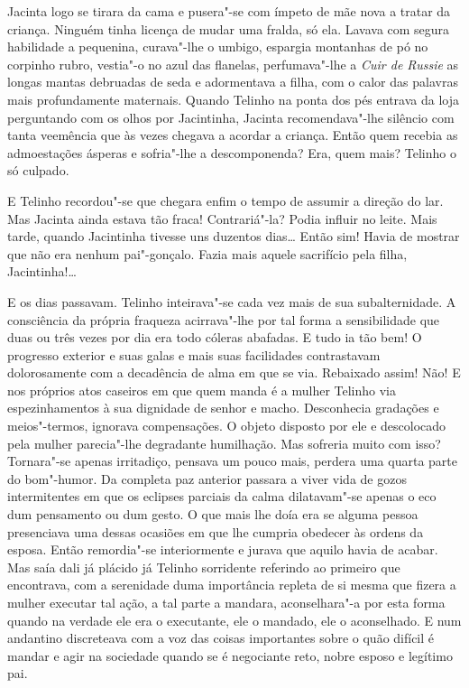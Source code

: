 Jacinta logo se tirara da cama e pusera"-se com ímpeto de mãe nova a
tratar da criança. Ninguém tinha licença de mudar uma fralda, só ela.
Lavava com segura habilidade a pequenina, curava"-lhe o umbigo, espargia
montanhas de pó no corpinho rubro, vestia"-o no azul das flanelas,
perfumava"-lhe a \emph{Cuir de Russie} as longas mantas debruadas de seda
e adormentava a filha, com o calor das palavras mais profundamente
maternais. Quando Telinho na ponta dos pés entrava da loja perguntando
com os olhos por Jacintinha, Jacinta recomendava"-lhe silêncio com tanta
veemência que às vezes chegava a acordar a criança. Então quem recebia
as admoestações ásperas e sofria"-lhe a descomponenda? Era, quem mais?
Telinho o só culpado.

E Telinho recordou"-se que chegara enfim o tempo de assumir a direção do
lar. Mas Jacinta ainda estava tão fraca! Contrariá"-la? Podia influir no
leite. Mais tarde, quando Jacintinha tivesse uns duzentos dias\ldots{} Então
sim! Havia de mostrar que não era nenhum pai"-gonçalo. Fazia mais aquele
sacrifício pela filha, Jacintinha!\ldots{}

E os dias passavam. Telinho inteirava"-se cada vez mais de sua
subalternidade. A consciência da própria fraqueza acirrava"-lhe por tal
forma a sensibilidade que duas ou três vezes por dia era todo cóleras
abafadas. E tudo ia tão bem! O progresso exterior e suas galas e mais
suas facilidades contrastavam dolorosamente com a decadência de alma em
que se via. Rebaixado assim! Não! E nos próprios atos caseiros em que
quem manda é a mulher Telinho via espezinhamentos à sua dignidade de
senhor e macho. Desconhecia gradações e meios"-termos, ignorava
compensações. O objeto disposto por ele e descolocado pela mulher
parecia"-lhe degradante humilhação. Mas sofreria muito com isso?
Tornara"-se apenas irritadiço, pensava um pouco mais, perdera uma quarta
parte do bom"-humor. Da completa paz anterior passara a viver vida de
gozos intermitentes em que os eclipses parciais da calma dilatavam"-se
apenas o eco dum pensamento ou dum gesto. O que mais lhe doía era se
alguma pessoa presenciava uma dessas ocasiões em que lhe cumpria
obedecer às ordens da esposa. Então remordia"-se interiormente e jurava
que aquilo havia de acabar. Mas saía dali já plácido já Telinho
sorridente referindo ao primeiro que encontrava, com a serenidade duma
importância repleta de si mesma que fizera a mulher executar tal ação, a
tal parte a mandara, aconselhara"-a por esta forma quando na verdade ele
era o executante, ele o mandado, ele o aconselhado. E num andantino
discreteava com a voz das coisas importantes sobre o quão difícil é
mandar e agir na sociedade quando se é negociante reto, nobre esposo e
legítimo pai.

